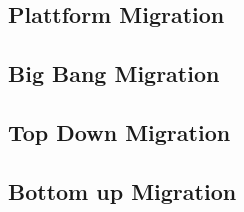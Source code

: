 


\subsection{Plattform Migration}

\subsection{Big Bang Migration}

\subsection{Top Down Migration}

\subsection{Bottom up Migration}


